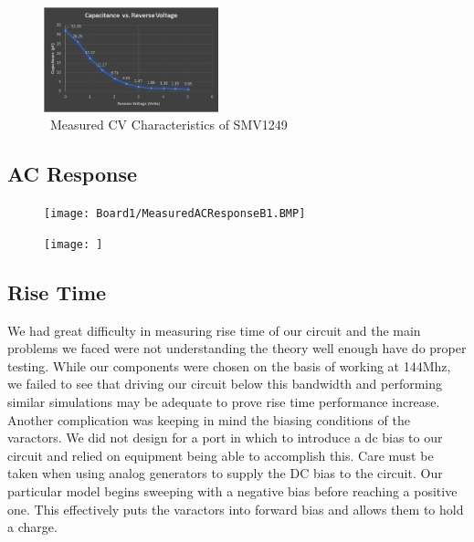 \documentclass[journal]{IEEEtran}
\begin{document}
 
\begin{figure}[htb]
\centering
\includegraphics[width=0.45\textwidth]{SMV1249_CV}
\caption{\ Measured CV Characteristics of SMV1249 
}\label{fig:SMV1249CV}
\end{figure}


\subsection{AC Response}\label{ACMeasResults}

\begin{figure}[htb]
\centering
\texttt{[image: Board1/MeasuredACResponseB1.BMP]}
\caption{}
\label{}
\end{figure}

\begin{figure}[htb]
\centering
\texttt{[image: ]}
\caption{}
\label{}
\end{figure}





\subsection{Rise Time}\label{RiseTimeMeasResults}

We had great difficulty in measuring rise time of our circuit and the main problems we faced were not understanding the theory well enough have do proper testing. While our components were chosen on the basis of working at 144Mhz, we failed to see that driving our circuit below this bandwidth and performing similar simulations may be adequate to prove rise time performance increase. Another complication was keeping in mind the biasing conditions of the varactors. We did not design for a port in which to introduce a dc bias to our circuit and relied on equipment being able to accomplish this. Care must be taken when using analog generators to supply the DC bias to the circuit. Our particular model begins sweeping with a negative bias before reaching a positive one. This effectively puts the varactors into forward bias and allows them to hold a charge. 
\end{document}

